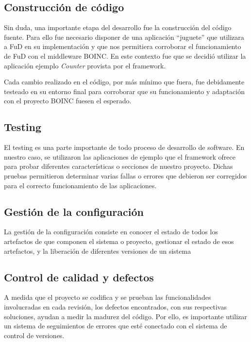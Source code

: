 \subsection{Construcción de código}

Sin duda, una importante etapa del desarrollo fue la construcción del código fuente. Para ello fue necesario disponer de una aplicación ``juguete'' que utilizara a FuD en su implementación y que nos permitiera corroborar el funcionamiento de FuD con el middleware BOINC. En este contexto fue que se decidió utilizar la aplicación ejemplo \textit{Counter} provista por el framework.

Cada cambio realizado en el código, por más mínimo que fuera, fue debidamente testeado en su entorno final para corroborar que su funcionamiento y adaptación con el proyecto BOINC fuesen el esperado.

\subsection{Testing}

El testing es una parte importante de todo proceso de desarrollo de software. En nuestro caso, se utilizaron las aplicaciones de ejemplo que el framework ofrece para probar diferentes características o secciones de nuestro proyecto. Dichas pruebas permitieron determinar varias fallas o errores que debieron ser corregidos para el correcto funcionamiento de las aplicaciones.  

\subsection{Gestión de la configuración}

La gestión de la configuración consiste en conocer el estado de todos los artefactos de que componen el sistema o proyecto, gestionar el estado de esos artefactos, y la liberación de diferentes versiones de un sistema

\subsection{Control de calidad y defectos}

A medida que el proyecto se codifica y se prueban las funcionalidades involucradas en cada revisión, los defectos encontrados, con sus respectivas soluciones, ayudan a medir la madurez del código. Por ello, es importante utilizar un sistema de seguimientos de errores que esté conectado con el sistema de control de versiones.


